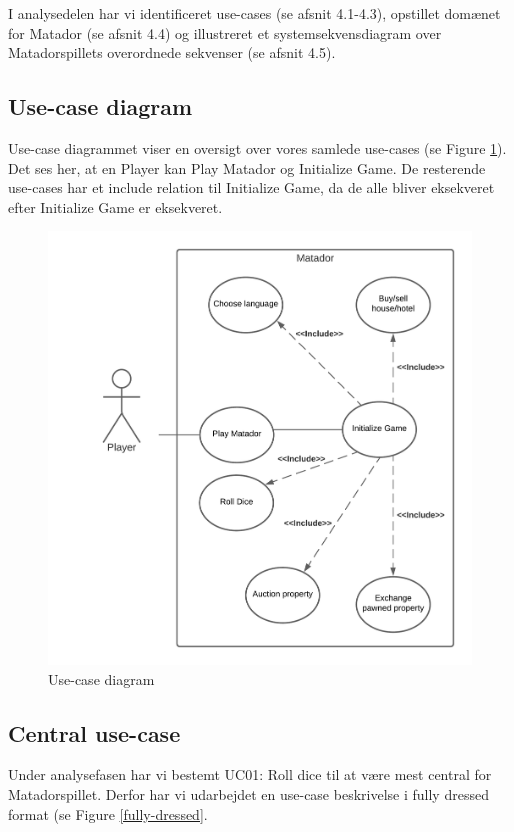 \begin{flushleft}
\doublespacing
I analysedelen har vi identificeret use-cases (se afsnit 4.1-4.3), opstillet domænet for Matador (se afsnit 4.4) og illustreret et systemsekvensdiagram over Matadorspillets overordnede sekvenser (se afsnit 4.5).
\subsection{Use-case diagram}
Use-case diagrammet viser en oversigt over vores samlede use-cases (se Figure \ref{use-case diagram}). Det ses her, at en Player kan Play Matador og Initialize Game. De resterende use-cases har et include relation til Initialize Game, da de alle bliver eksekveret efter Initialize Game er eksekveret.
\begin{figure}[H]
    \centering
    \includegraphics[width=12cm]{Report/figures/Use Case Diagram.png}
    \caption{Use-case diagram}
    \label{use-case diagram}
\end{figure}

\subsection{Central use-case}
Under analysefasen har vi bestemt UC01: Roll dice til at være mest central for Matadorspillet. Derfor har vi udarbejdet en use-case beskrivelse i fully dressed format (se Figure \ref{fully-dressed}. \\


\end{flushleft}
